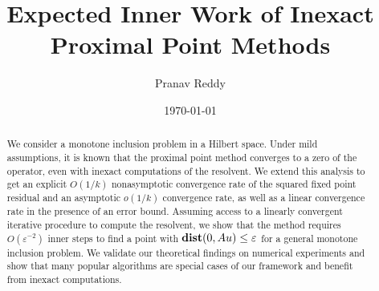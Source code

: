 \documentclass[11pt]{article}
\title{Expected Inner Work of Inexact Proximal Point Methods}
\author{Pranav Reddy}
\date{\small \today \vspace{-5mm}}
\begin{document}
\maketitle
\begin{abstract}
    We consider a monotone inclusion problem in a Hilbert space.
    Under mild assumptions, it is known that the proximal point method converges to a zero of the operator, even with inexact computations of the resolvent.
    We extend this analysis to get an explicit $O(1/k)$ nonasymptotic convergence rate of the squared fixed point residual and an asymptotic $o(1/k)$ convergence rate, as well as a linear convergence rate in the presence of an error bound.
    Assuming access to a linearly convergent iterative procedure to compute the resolvent, we show that the method requires $O(\varepsilon^{-2})$ inner steps to find a point with $\mathop{\bf dist{}}(0,{A} u) \leq\varepsilon$ for a general monotone inclusion problem.
    We validate our theoretical findings on numerical experiments and show that many popular algorithms are special cases of our framework and benefit from inexact computations.
\end{abstract}
\end{document}
